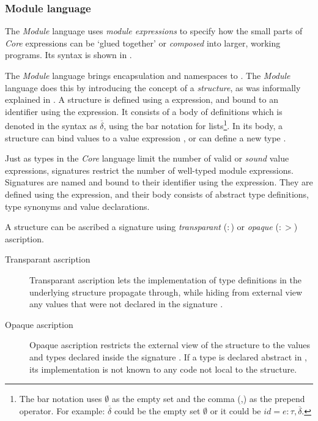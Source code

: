 \subsubsection{Module language}
The \emph{Module} language uses \emph{module expressions}  to specify how the small parts of \emph{Core} expressions can be `glued together' or \emph{composed} into larger, working programs.
Its syntax is shown in .

The \emph{Module} language brings encapsulation and namespaces to \MiniML.
The \emph{Module} language does this by introducing the concept of a \emph{structure}, as was informally explained in .
A structure is defined using a  expression, and bound to an identifier  using the  expression.
It consists of a body of definitions which is denoted in the syntax as $\overline{\mathit{\delta}}$, using the bar notation for lists\footnote{
The bar notation uses $\emptyset$ as the empty set and the comma (,) as the prepend operator.
For example: $\overline{\mathit{\delta}}$ could be the empty set $\emptyset$ or it could be $id = e:\tau, \overline{\delta}$.}.
In its body, a structure  can bind values  to a value expression , or can define a new type .

Just as types in the \emph{Core} language limit the number of valid or \emph{sound} value expressions, signatures restrict the number of well-typed module expressions.
Signatures are named and bound to their identifier using the  expression. 
They are defined using the  expression, and their body consists of abstract type definitions, type synonyms and value declarations.

A structure can be ascribed a signature using \emph{transparant} ($:$) or \emph{opaque} ($:>$) ascription.
\begin{description}
\item[Transparant ascription] Transparant ascription  lets the implementation of type definitions in the underlying structure  propagate through, while hiding from external view any values that were not declared in the signature .
\item[Opaque ascription] Opaque ascription  restricts the external view of the structure to the values and types declared inside the signature .
If a type  is declared abstract in , its implementation is not known to any code not local to the structure.
\end{description}

